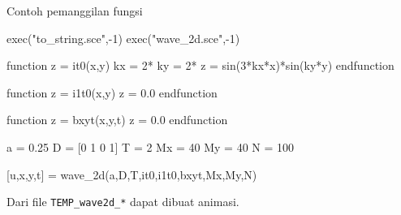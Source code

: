 \documentclass[10pt,bahasa]{article}
\begin{document}
Contoh pemanggilan fungsi

\begin{scilabcode}
exec("to_string.sce",-1)
exec("wave_2d.sce",-1)

function z = it0(x,y)
  kx = 2*%
  ky = 2*%
  z = sin(3*kx*x)*sin(ky*y)
endfunction

function z = i1t0(x,y)
  z = 0.0
endfunction

function z = bxyt(x,y,t)
  z = 0.0
endfunction

a = 0.25
D = [0 1 0 1]
T = 2
Mx = 40
My = 40
N = 100

[u,x,y,t] = wave_2d(a,D,T,it0,i1t0,bxyt,Mx,My,N)
\end{scilabcode}

Dari file \verb|TEMP_wave2d_*| dapat dibuat animasi.
\end{document}
